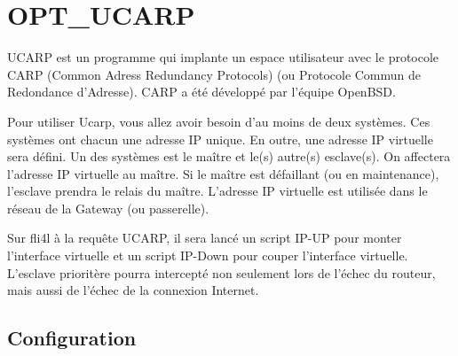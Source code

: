 
{
\section {OPT\_UCARP}
}
UCARP est un programme qui implante un espace utilisateur avec le protocole
CARP (Common Adress Redundancy Protocols) (ou Protocole Commun de Redondance
d'Adresse). CARP a été développé par l'équipe OpenBSD.

Pour utiliser Ucarp, vous allez avoir besoin d'au moins de deux systèmes. Ces
systèmes ont chacun une adresse IP unique. En outre, une adresse IP virtuelle
sera défini. Un des systèmes est le maître et le(s) autre(s) esclave(s). On
affectera l'adresse IP virtuelle au maître. Si le maître est défaillant
(ou en maintenance), l'esclave prendra le relais du maître. L'adresse IP virtuelle
est utilisée dans le réseau de la Gateway (ou passerelle).

Sur fli4l à la requête UCARP, il sera lancé un script IP-UP pour monter l'interface
virtuelle et un script IP-Down pour couper l'interface virtuelle. L'esclave
prioritère pourra intercepté non seulement lors de l'échec du routeur, mais
aussi de l'échec de la connexion Internet.

\subsection{Configuration}

